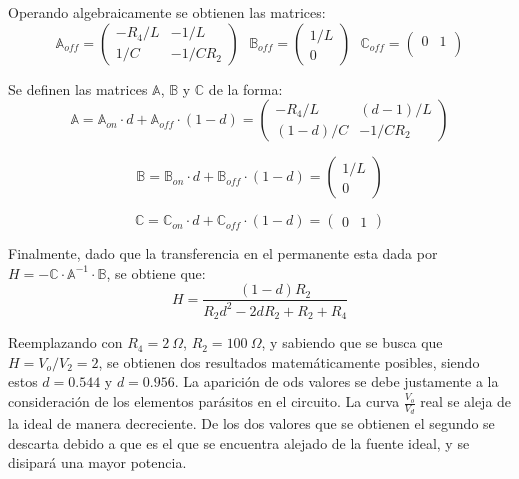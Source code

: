 Operando algebraicamente se obtienen las matrices: 
\begin{equation*}
\mathbb{A}_{off} =  \begin{pmatrix}
	-R_4/L & -1/L \\
	1/C & -1/ C R_2
\end{pmatrix} \ \ \
\mathbb{B}_{off} =  \begin{pmatrix}
	1/L \\
	0
\end{pmatrix} \ \ \
\mathbb{C}_{off} =  \begin{pmatrix}
	0 & 1 \\
\end{pmatrix}
\end{equation*}

Se definen las matrices $\mathbb{A}$, $\mathbb{B}$ y $\mathbb{C}$ de la forma:
\begin{equation*}
\mathbb{A} = \mathbb{A}_{on} \cdot d + \mathbb{A}_{off} \cdot (1-d) =  \begin{pmatrix}
	-R_4/L & (d-1)/L \\
	(1-d)/C & -1/ C R_2
\end{pmatrix}
\end{equation*}

\begin{equation*}
\mathbb{B} = \mathbb{B}_{on} \cdot d + \mathbb{B}_{off} \cdot (1-d) = \begin{pmatrix}
	1/L \\
	0
\end{pmatrix}
\end{equation*}

\begin{equation*}
\mathbb{C} = \mathbb{C}_{on} \cdot d + \mathbb{C}_{off} \cdot (1-d) = \begin{pmatrix}
	0 & 1
\end{pmatrix}
\end{equation*}

Finalmente, dado que la transferencia en el permanente esta dada por $H = -\mathbb{C} \cdot \mathbb{A}^{-1} \cdot \mathbb{B}$, se obtiene que:
\begin{equation*}
H = \frac{\left( 1 - d \right) R_2}{R_2 d^2 - 2 d R_2 + R_2 + R_4}
\end{equation*}

Reemplazando con $R_4 = 2 \ \Omega$, $R_2 = 100 \ \Omega$, y sabiendo que se busca que $H = V_o / V_2 = 2$, se obtienen dos resultados matemáticamente posibles, siendo estos $d = 0.544$ y $d = 0.956$. La aparición de ods valores se debe justamente a la consideración de los elementos parásitos en el circuito. La curva $\frac{V_o}{V_d}$ real se aleja de la ideal de manera decreciente. De los dos valores que se obtienen el segundo se descarta debido a que es el que se encuentra alejado de la fuente ideal, y se disipará una mayor potencia.

